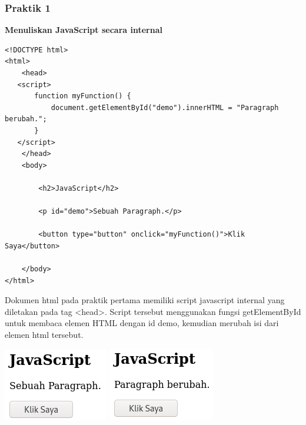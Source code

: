 \documentclass[a4paper,12pt]{article}
\begin{document}
\subsubsection{Praktik 1}
\textbf{Menuliskan JavaScript secara internal\\}
\begin{lstlisting}[style=htmlcssjs]
<!DOCTYPE html>
<html>
    <head>
   <script>
       function myFunction() {
           document.getElementById("demo").innerHTML = "Paragraph berubah.";
       }
   </script>
    </head>
    <body>

        <h2>JavaScript</h2>

        <p id="demo">Sebuah Paragraph.</p>

        <button type="button" onclick="myFunction()">Klik Saya</button>

    </body>
</html>
\end{lstlisting}
Dokumen html pada praktik pertama memiliki script javascript internal yang diletakan pada tag <head>. Script tersebut
menggunakan fungsi getElementById untuk membaca elemen HTML dengan id demo, kemudian merubah isi dari elemen html
tersebut.
\begin{center}
    \includegraphics[scale=.7]{1.png} 
    \includegraphics[scale=.7]{1a.png} 
\end{center}
\end{document}
